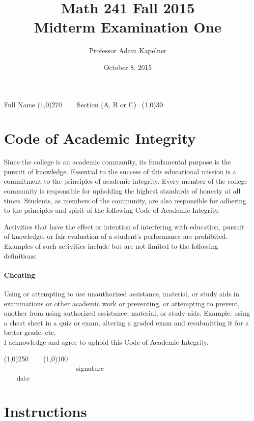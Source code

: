 \documentclass[12pt]{article}
\title{Math 241 Fall 2015 \\ Midterm Examination One}
\author{Professor Adam Kapelner}
\date{October 8, 2015}
\begin{document}
\maketitle

\noindent Full Name \line(1,0){270} ~~~ Section (A, B or C)~ \line(1,0){30}

\thispagestyle{empty}

\section*{Code of Academic Integrity}

\footnotesize
Since the college is an academic community, its fundamental purpose is the pursuit of knowledge. Essential to the success of this educational mission is a commitment to the principles of academic integrity. Every member of the college community is responsible for upholding the highest standards of honesty at all times. Students, as members of the community, are also responsible for adhering to the principles and spirit of the following Code of Academic Integrity.

Activities that have the effect or intention of interfering with education, pursuit of knowledge, or fair evaluation of a student's performance are prohibited. Examples of such activities include but are not limited to the following definitions:

\paragraph{Cheating} Using or attempting to use unauthorized assistance, material, or study aids in examinations or other academic work or preventing, or attempting to prevent, another from using authorized assistance, material, or study aids. Example: using a cheat sheet in a quiz or exam, altering a graded exam and resubmitting it for a better grade, etc.
\\

\noindent I acknowledge and agree to uphold this Code of Academic Integrity. \\

\begin{center}
\line(1,0){250} ~~~ \line(1,0){100}\\
~~~~~~~~~~~~~~~~~~~~~signature~~~~~~~~~~~~~~~~~~~~~~~~~~~~~~~~~~~~~~~~~~~~~ date
\end{center}

\normalsize

\section*{Instructions}
\end{document}
